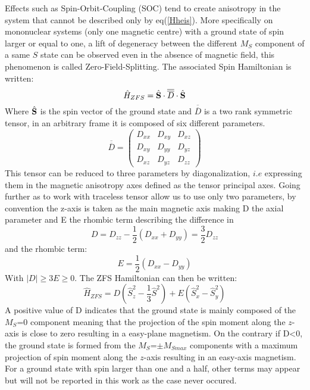 \documentclass[12pt]{article}
\numberwithin{equation}{section}
\begin{document}
\par Effects such as Spin-Orbit-Coupling (SOC) tend to create anisotropy in the system that cannot be described only by eq(\ref{Hheis}). 
More specifically on mononuclear systems (only one magnetic centre) with a ground state of spin larger or equal to one, a lift of degeneracy between the different $M_S$ component of a same $S$ state can be observed even in the absence of magnetic field, this phenomenon is called Zero-Field-Splitting.
The associated Spin Hamiltonian is written:
\begin{equation}\label{SDS}
    \hat{H}_{ZFS}=\hat{\vb S} \cdot \overline{\overline{D}} \cdot \hat{\vb S}
\end{equation}
Where $\hat{\vb S}$ is the spin vector of the ground state and $\overline{\overline{D}}$ is a two rank symmetric tensor, in an arbitrary frame it is composed of six different parameters.
\begin{equation}
    \overline{\overline{D}}=\begin{pmatrix}
        D_{xx} & D_{xy} & D_{xz}\\
        D_{xy} & D_{yy} & D_{yz}\\
        D_{xz} & D_{yz} & D_{zz}
    \end{pmatrix}
\end{equation}
This tensor can be reduced to three parameters by diagonalization, $\textit{i.e}$ expressing them in the magnetic anisotropy axes defined as the tensor principal axes.
Going further as to work with traceless tensor allow us to use only two parameters, by convention the z-axis is taken as the main magnetic axis making D the axial parameter and E the rhombic term describing the difference in 
\begin{equation}\label{ParametreD}
    D=D_{zz}-\frac{1}{2}(D_{xx}+D_{yy})=\frac{3}{2}D_{zz}
\end{equation}
and the rhombic term:
\begin{equation}\label{ParametreE}
    E=\frac{1}{2}(D_{xx}-D_{yy})
\end{equation}
With $|D| \geq 3E \geq 0$. 
The ZFS Hamiltonian can then be written:
\begin{equation}  %
    \hat{H}_{ZFS}=D (\hat{S}_z^2-\frac{1}{3}\hat{S}^2)+E(\hat{S}_x^2-\hat{S}_y^2)
\end{equation}
A positive value of D indicates that the ground state is mainly composed of the $M_S$=0 component meaning that the projection of the spin moment along the $z$-axis is close to zero resulting in a easy-plane magnetism. 
On the contrary if D<0, the ground state is formed from the $M_S$=$\pm M_{Smax}$ components with a maximum projection of spin moment along the $z$-axis resulting in an easy-axis magnetism.
For a ground state with spin larger than one and a half, other terms may appear but will not be reported in this work as the case never occured.
\end{document}
